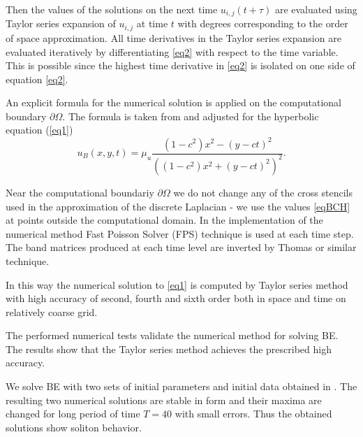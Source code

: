 \documentclass{article}
\begin{document}
Then the values of the solutions on the next time $u_{i,j}(t+\tau)$ are evaluated using Taylor series expansion of $u_{i,j}$ at time $t$ with degrees corresponding to the order of space approximation. All time derivatives in the Taylor series expansion are evaluated iteratively by differentiating \eqref{eq2} with respect to the time variable. This is possible since the highest time derivative in \eqref{eq2} is isolated on one side of equation \eqref{eq2}. %

An explicit formula for the numerical solution is applied on the computational boundary $\partial \Omega$. The formula is taken from \cite{BoundaryProblem} and adjusted for the hyperbolic equation (\ref{eq1})
\begin{equation}\label{eqBCH}
u_B(x, y, t) = \mu_u \frac{ (1 - c^2) x^2 - (y-ct)^2}{( (1 - c^2) x^2 + (y-ct)^2)^2}.
\end{equation}

Near the computational boundariy $\partial \Omega$ we do not change any of the cross stencils used in the approximation of the discrete Laplacian - 
we use the values \eqref{eqBCH} at points outside the computational domain. In the implementation of the numerical method Fast Poisson Solver (FPS) technique  is used at each time  step. The band matrices produced at each time level are inverted by Thomas or similar technique.

In this way the numerical solution to \eqref{eq1} is computed by Taylor series method with high accuracy of second, fourth and sixth order both in space and time on relatively coarse grid.

The performed numerical tests validate the numerical method for solving BE. The results show that the  Taylor series method achieves the prescribed high accuracy. 

We solve BE with two sets of initial parameters and initial data obtained in \cite{EllipticProblem}. 
The resulting two numerical solutions are stable in form and their maxima are changed for
long period of time $T = 40$ with small errors. Thus the obtained solutions show soliton behavior.
\end{document}
